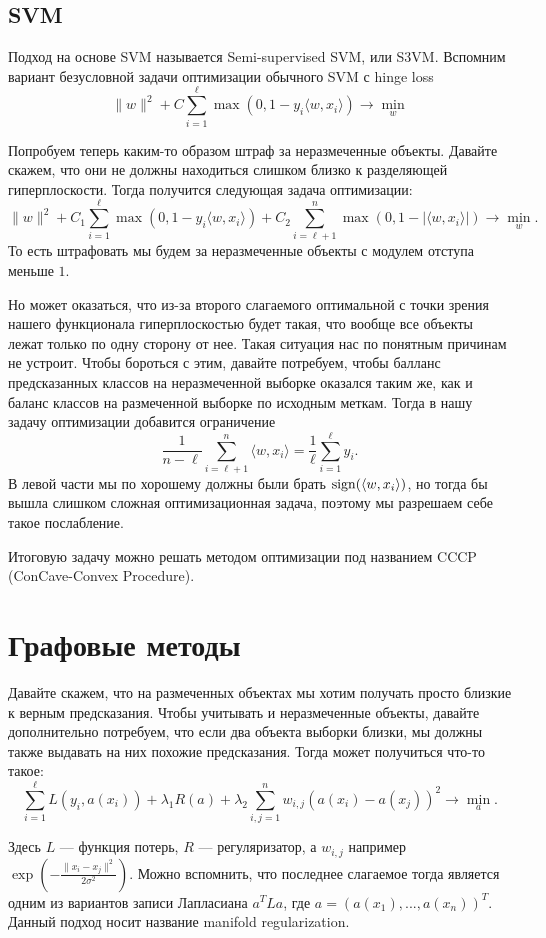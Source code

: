 \documentclass[12pt,fleqn]{article}
\begin{document}
\subsection{SVM}

Подход на основе SVM называется Semi-supervised SVM, или S3VM. Вспомним вариант безусловной задачи оптимизации обычного SVM с hinge loss
\[
\|w\|^2 + C \sum\limits_{i = 1}^\ell \max(0, 1 - y_i \langle w, x_i \rangle) \to \min_{w}
\]

Попробуем теперь каким-то образом штраф за неразмеченные объекты. Давайте скажем, что они не должны находиться слишком близко к разделяющей гиперплоскости. Тогда получится следующая задача оптимизации:
\[
\|w\|^2 + C_1 \sum\limits_{i = 1}^\ell \max(0, 1 - y_i \langle w, x_i \rangle) + C_2 \sum\limits_{i = \ell + 1}^n \max(0, 1 - |\langle w, x_i \rangle|) \to \min_{w}.
\]
То есть штрафовать мы будем за неразмеченные объекты с модулем отступа меньше $1$. 

Но может оказаться, что из-за второго слагаемого оптимальной с точки зрения нашего функционала гиперплоскостью будет такая, что вообще все объекты лежат только по одну сторону от нее. Такая ситуация нас по понятным причинам не устроит. Чтобы бороться с этим, давайте потребуем, чтобы балланс предсказанных классов на неразмеченной выборке оказался таким же, как и баланс классов на размеченной выборке по исходным меткам. Тогда в нашу задачу оптимизации добавится ограничение
\[
\frac{1}{n - \ell} \sum\limits_{i = \ell + 1}^n \langle w, x_i \rangle = \frac{1}{\ell} \sum\limits_{i = 1}^\ell y_i.
\]
В левой части мы по хорошему должны были брать $\mathop{\rm sign}\limits(\langle w, x_i \rangle)$, но тогда бы вышла слишком сложная оптимизационная задача, поэтому мы разрешаем себе такое послабление. 

Итоговую задачу можно решать методом оптимизации под названием CCCP (ConCave-Convex Procedure).

\section{Графовые методы}

Давайте скажем, что на размеченных объектах мы хотим получать просто близкие к верным предсказания. Чтобы учитывать и неразмеченные объекты, давайте дополнительно потребуем, что если два объекта выборки близки, мы должны также выдавать на них похожие предсказания. Тогда может получиться что-то такое:
\[
\sum\limits_{i = 1}^\ell L(y_i, a(x_i)) + \lambda_1 R(a) + \lambda_2 \sum\limits_{i, j = 1}^n w_{i,j}(a(x_i) - a(x_j))^2 \to \min_{a}.
\]

Здесь $L$ — функция потерь, $R$ — регуляризатор, а $w_{i,j}$ например $\exp(-\frac{\|x_i - x_j\|^2}{2\sigma^2})$. Можно вспомнить, что последнее слагаемое тогда является одним из вариантов записи Лапласиана $a^T L a$, где $a = (a(x_1), ..., a(x_n))^T$. Данный подход носит название manifold regularization. 
\end{document}
